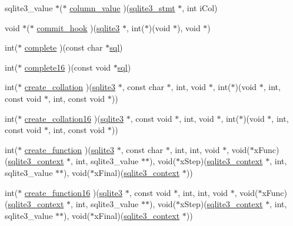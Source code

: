 \begin{DoxyCompactItemize}
\item 
sqlite3\+\_\+value $\ast$($\ast$ \hyperlink{structsqlite3__api__routines_aefb5910a72db46607d30a1d7d8e1545a}{column\+\_\+value} )(\hyperlink{sqlite3_8c_af2a033da1327cdd77f0a174a09aedd0c}{sqlite3\+\_\+stmt} $\ast$, int i\+Col)
\item 
void $\ast$($\ast$ \hyperlink{structsqlite3__api__routines_aeaaa1a1102ac1a488fff8dab42260993}{commit\+\_\+hook} )(\hyperlink{structsqlite3}{sqlite3} $\ast$, int($\ast$)(void $\ast$), void $\ast$)
\item 
int($\ast$ \hyperlink{structsqlite3__api__routines_a01aaed823d8c17a17f125d1abaf5eac9}{complete} )(const char $\ast$\hyperlink{structsqlite3__api__routines_a2659f30cca776687b888db7a811642ac}{sql})
\item 
int($\ast$ \hyperlink{structsqlite3__api__routines_a6d6690a5ad824d944df098f0efb92c06}{complete16} )(const void $\ast$\hyperlink{structsqlite3__api__routines_a2659f30cca776687b888db7a811642ac}{sql})
\item 
int($\ast$ \hyperlink{structsqlite3__api__routines_aba03b11b6904d9c6796bb4ada1a0adbe}{create\+\_\+collation} )(\hyperlink{structsqlite3}{sqlite3} $\ast$, const char $\ast$, int, void $\ast$, int($\ast$)(void $\ast$, int, const void $\ast$, int, const void $\ast$))
\item 
int($\ast$ \hyperlink{structsqlite3__api__routines_a2a103db00b3e96982f961473802801f3}{create\+\_\+collation16} )(\hyperlink{structsqlite3}{sqlite3} $\ast$, const void $\ast$, int, void $\ast$, int($\ast$)(void $\ast$, int, const void $\ast$, int, const void $\ast$))
\item 
int($\ast$ \hyperlink{structsqlite3__api__routines_a6efc8419dc21d8abea4bd5cbc323b0fe}{create\+\_\+function} )(\hyperlink{structsqlite3}{sqlite3} $\ast$, const char $\ast$, int, int, void $\ast$, void($\ast$x\+Func)(\hyperlink{structsqlite3__context}{sqlite3\+\_\+context} $\ast$, int, sqlite3\+\_\+value $\ast$$\ast$), void($\ast$x\+Step)(\hyperlink{structsqlite3__context}{sqlite3\+\_\+context} $\ast$, int, sqlite3\+\_\+value $\ast$$\ast$), void($\ast$x\+Final)(\hyperlink{structsqlite3__context}{sqlite3\+\_\+context} $\ast$))
\item 
int($\ast$ \hyperlink{structsqlite3__api__routines_a92b6252a9902db87b47529c31f1dc97c}{create\+\_\+function16} )(\hyperlink{structsqlite3}{sqlite3} $\ast$, const void $\ast$, int, int, void $\ast$, void($\ast$x\+Func)(\hyperlink{structsqlite3__context}{sqlite3\+\_\+context} $\ast$, int, sqlite3\+\_\+value $\ast$$\ast$), void($\ast$x\+Step)(\hyperlink{structsqlite3__context}{sqlite3\+\_\+context} $\ast$, int, sqlite3\+\_\+value $\ast$$\ast$), void($\ast$x\+Final)(\hyperlink{structsqlite3__context}{sqlite3\+\_\+context} $\ast$))

\end{DoxyCompactItemize}

